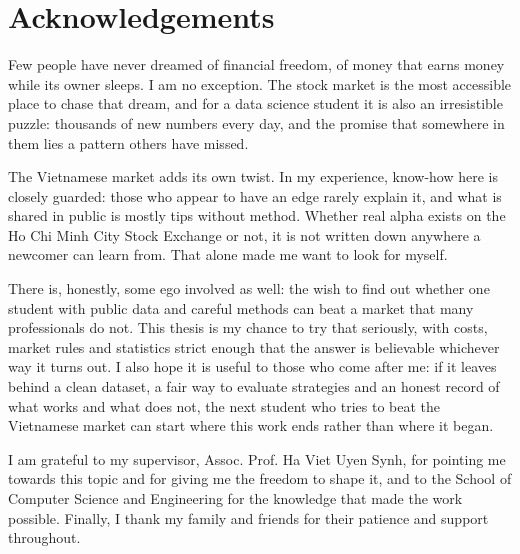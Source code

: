 \chapter*{Acknowledgements}

Few people have never dreamed of financial freedom, of money that earns money while its owner
sleeps. I am no exception. The stock market is the most accessible place to chase that dream,
and for a data science student it is also an irresistible puzzle: thousands of new numbers
every day, and the promise that somewhere in them lies a pattern others have missed.

The Vietnamese market adds its own twist. In my experience, know-how here is closely guarded:
those who appear to have an edge rarely explain it, and what is shared in public is mostly tips
without method. Whether real alpha exists on the Ho Chi Minh City Stock Exchange or not, it is
not written down anywhere a newcomer can learn from. That alone made me want to look for myself.

There is, honestly, some ego involved as well: the wish to find out whether one student with
public data and careful methods can beat a market that many professionals do not. This thesis
is my chance to try that seriously, with costs, market rules and statistics strict enough that
the answer is believable whichever way it turns out. I also hope it is useful to those who come
after me: if it leaves behind a clean dataset, a fair way to evaluate strategies and an honest
record of what works and what does not, the next student who tries to beat the Vietnamese
market can start where this work ends rather than where it began.

I am grateful to my supervisor, Assoc. Prof. Ha Viet Uyen Synh, for pointing me towards this
topic and for giving me the freedom to shape it, and to the School of Computer Science and
Engineering for the knowledge that made the work possible. Finally, I thank my family and
friends for their patience and support throughout.
